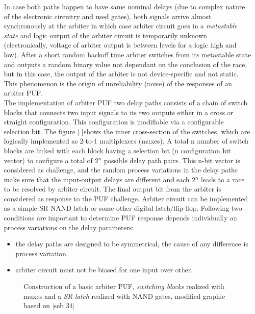 In case both paths happen to have same nominal delays (due to complex nature of the electronic circuitry and used gates), both signals arrive almost synchronously at the arbiter in which case arbiter circuit goes in a \emph{metastable state} and logic output of the arbiter circuit is temporarily unknown (electronically, voltage of arbiter output is between levels for a logic high and low). After a short random backoff time arbiter switches from its metastable state and outputs a random binary
value not dependant on the conclusion of the race, but in this case, the output of the arbiter is not device-specific and not static. This phenomenon is the origin of unreliability (noise) of the responses of an arbiter PUF.\\

The implementation of arbiter PUF two delay paths consists of a chain of switch blocks that connects two input signals to its two outputs either in a cross or straight configuration. This configuration is modifiable via a configurable selection bit. The figure [ ]shows the inner cross-section of the switches, which are logically implemented as 2-to-1 multiplexers (muxes). A total n number of switch blocks are linked with each block having a selection bit (n configuration bit vector) to
configure a total of 2$^n$ possible delay path pairs. This n-bit vector is considered as challenge, and the random process variations in the delay paths make sure that the input-output delays are different and each 2$^n$ leads to a race to be resolved by arbiter circuit. The final output bit from the arbiter is considered as response to the PUF challenge. Arbiter circuit can be implemented as a simple SR NAND latch or some other digital latch/flip-flop. Following two conditions are
important to determine PUF response depends individually on process variations on the delay parameters:
\begin{itemize}
	\item the delay paths are designed to be symmetrical, the cause of any difference is process variation.
	\item arbiter circuit must not be biased for one input over other.
\end{itemize}

\begin{figure}
	\centering
	\caption{Construction of a basic arbiter PUF, \emph{switching blocks} realized with muxes and a \emph{SR latch} realized with NAND gates, modified graphic based on [seb 34]}
	\label{img:1}
\end{figure}

